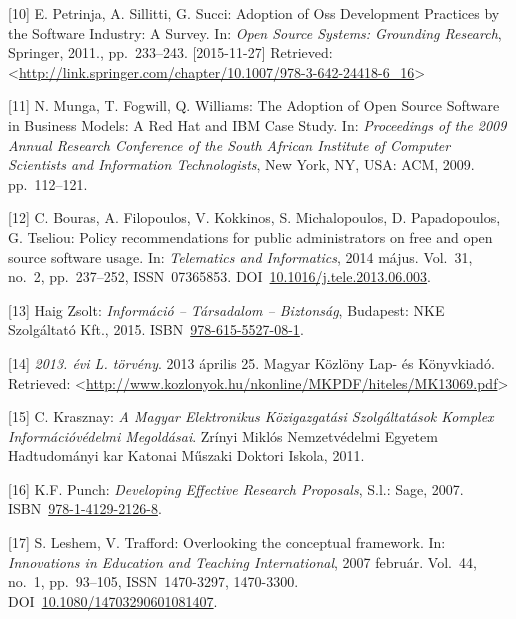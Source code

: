 \documentclass[12pt,magyar,a4paper,oneside]{scrreprt}
\begin{document}
\leavevmode\hypertarget{ref-petrinja_adoption_2011}{}%
{[}10{]} E. Petrinja, A. Sillitti, G. Succi: Adoption of Oss Development
Practices by the Software Industry: A Survey. In: \emph{Open Source
Systems: Grounding Research}, Springer, 2011., pp.~233--243.
{[}2015-11-27{]} Retrieved:
\textless{}\url{http://link.springer.com/chapter/10.1007/978-3-642-24418-6_16}\textgreater{}

\leavevmode\hypertarget{ref-munga_adoption_2009}{}%
{[}11{]} N. Munga, T. Fogwill, Q. Williams: The Adoption of Open Source
Software in Business Models: A Red Hat and IBM Case Study. In:
\emph{Proceedings of the 2009 Annual Research Conference of the South
African Institute of Computer Scientists and Information Technologists},
New York, NY, USA: ACM, 2009. pp.~112--121.

\leavevmode\hypertarget{ref-bouras_policy_2014}{}%
{[}12{]} C. Bouras, A. Filopoulos, V. Kokkinos, S. Michalopoulos, D.
Papadopoulos, G. Tseliou: Policy recommendations for public
administrators on free and open source software usage. In:
\emph{Telematics and Informatics}, 2014 május. Vol.~31, no.~2,
pp.~237--252, ISSN~07365853.
DOI~\href{https://doi.org/10.1016/j.tele.2013.06.003}{10.1016/j.tele.2013.06.003}.

\leavevmode\hypertarget{ref-haig_zsolt_informacio_2015}{}%
{[}13{]} Haig Zsolt: \emph{Információ -- Társadalom -- Biztonság},
Budapest: NKE Szolgáltató Kft., 2015.
ISBN~\href{https://worldcat.org/isbn/978-615-5527-08-1}{978-615-5527-08-1}.

\leavevmode\hypertarget{ref-noauthor_2013._2013}{}%
{[}14{]} \emph{2013. évi L. törvény}. 2013 április 25. Magyar Közlöny
Lap- és Könyvkiadó. Retrieved:
\textless{}\url{http://www.kozlonyok.hu/nkonline/MKPDF/hiteles/MK13069.pdf}\textgreater{}

\leavevmode\hypertarget{ref-krasznay_magyar_2011}{}%
{[}15{]} C. Krasznay: \emph{A Magyar Elektronikus Közigazgatási
Szolgáltatások Komplex Információvédelmi Megoldásai}. Zrínyi Miklós
Nemzetvédelmi Egyetem Hadtudományi kar Katonai Műszaki Doktori Iskola,
2011.

\leavevmode\hypertarget{ref-punch_developing_2007}{}%
{[}16{]} K.F. Punch: \emph{Developing Effective Research Proposals},
S.l.: Sage, 2007.
ISBN~\href{https://worldcat.org/isbn/978-1-4129-2126-8}{978-1-4129-2126-8}.

\leavevmode\hypertarget{ref-leshem_overlooking_2007}{}%
{[}17{]} S. Leshem, V. Trafford: Overlooking the conceptual framework.
In: \emph{Innovations in Education and Teaching International}, 2007
február. Vol.~44, no.~1, pp.~93--105, ISSN~1470-3297, 1470-3300.
DOI~\href{https://doi.org/10.1080/14703290601081407}{10.1080/14703290601081407}.
\end{document}
